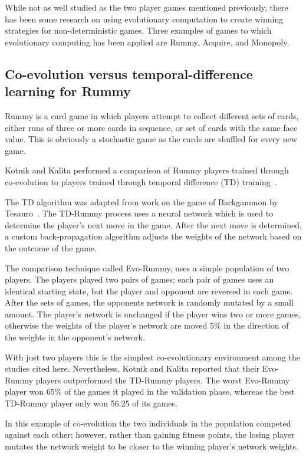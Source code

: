 While not as well studied as the two player games mentioned previously, there
has been some research on using evolutionary computation to create winning
strategies for non-deterministic games. Three examples of games to which
evolutionary computing has been applied are Rummy, Acquire, and Monopoly.

\subsection{Co-evolution versus temporal-difference learning for Rummy}

Rummy is a card game in which players attempt to collect different sets of
cards, either runs of three or more cards in sequence, or set of cards with the
same face value. This is obviously a stochastic game as the cards are shuffled
for every new game.

Kotnik and Kalita performed a comparison of Rummy players trained through
co-evolution to players trained through temporal difference (TD)
training~\cite{kotnik2003significance}.

The TD algorithm was adapted from work on the game of Backgammon by
Tesauro~\cite{tesauro1992practical,Tesauro:1995:TDL:203330.203343}. The TD-Rummy
process uses a neural network which is used to determine the player's next move
in the game. After the next move is determined, a custom back-propagation
algorithm adjusts the weights of the network based on the outcome of the game.

The comparison technique called Evo-Rummy, uses a simple population of two
players. The players played two pairs of games; each pair of games uses an
identical starting state, but the player and opponent are reversed in each game.
After the sets of games, the opponents network is randomly mutated by a small
amount. The player's network is unchanged if the player wins two or more games,
otherwise the weights of the player's network are moved 5\% in the direction of
the weights in the opponent's network.

With just two players this is the simplest co-evolutionary environment among the
studies cited here. Nevertheless, Kotnik and Kalita reported that their
Evo-Rummy players outperformed the TD-Rummy players. The worst Evo-Rummy player
won 65\% of the games it played in the validation phase, whereas the best
TD-Rummy player only won 56.25\* of its games.

In this example of co-evolution the two individuals in the population competed
against each other; however, rather than gaining fitness points, the losing
player mutates the network weight to be closer to the winning player's network
weights.

